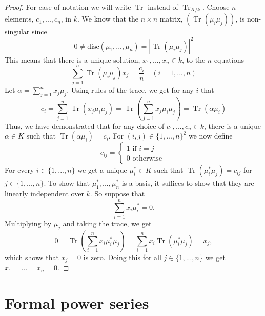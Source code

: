 \documentclass{article}
\DeclareMathOperator{\tr}{Tr}
\begin{document}
\begin{proof}
For ease of notation we will write $\tr$ instead of $\tr_{K/k}$. Choose $n$ elements, $c_1, ..., c_n$, in $k$. We know that the $n \times n$ matrix, $(\tr (\mu_i \mu_j))$, is non-singular since $$0 \neq \text{disc}(\mu_1, ..., \mu_n) = |\tr(\mu_i \mu_j)|^2$$
This means that there is a unique solution, $x_1, ..., x_n \in k$, to the $n$ equations
$$\sum_{j=1}^n \tr(\mu_i \mu_j) x_j = \frac{c_i}{n} \quad (i = 1, ..., n)$$
Let $\alpha = \sum_{j=1}^n x_j \mu_j$. Using rules of the trace, we get for any $i$ that
$$c_i = \sum_{j=1}^n \tr(x_j \mu_i \mu_j) = \tr(\sum_{j=1}^n x_j \mu_i \mu_j) = \tr(\alpha \mu_i)$$
Thus, we have demonstrated that for any choice of $c_1, ..., c_n \in k$, there is a unique $\alpha \in K$ such that $\tr(\alpha \mu_i)= c_i$. For $(i,j) \in \{1, ..., n\}^2$ we now define 
$$c_{ij} = \begin{cases*}
    1 \text{ if } i = j \\
    0 \text{ otherwise }
\end{cases*}$$
For every $i \in \{1, ..., n \}$ we get a unique $\mu_i^* \in K$ such that $\tr(\mu_i^* \mu_j) = c_{ij}$ for $j \in \{ 1, ..., n \}$. To show that $\mu_1^*, ..., \mu_n^*$ is a basis, it suffices to show that they are linearly independent over $k$. So suppose that
$$\sum_{i=1}^n x_i \mu_i^* = 0.$$
Multiplying by $\mu_j$ and taking the trace, we get
$$0 = \tr(\sum_{i=1}^n x_i \mu_i^* \mu_j) = \sum_{i=1}^n x_i \tr(\mu_i^* \mu_j) = x_j,$$
which shows that $x_j = 0$ is zero. Doing this for all $j \in \{1, ..., n \}$ we get $x_1 = ... = x_n = 0$.
\end{proof}



\section{Formal power series}
\end{document}

